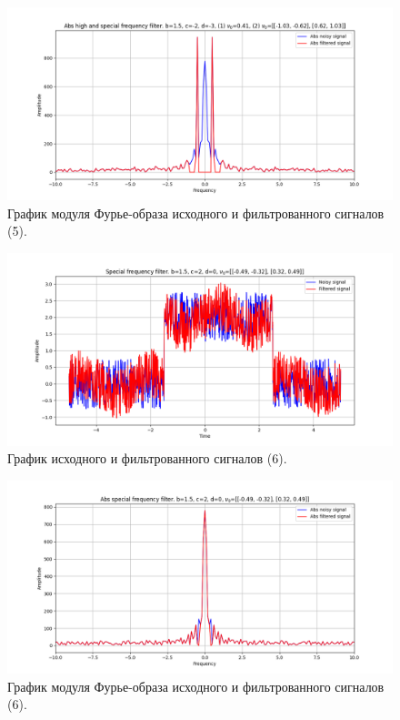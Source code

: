 \documentclass[a4paper, 12pt]{article}
\begin{document}
    \begin{figure}[H]
        \centering
        \includegraphics[scale=0.48]{5_4_abs_u_U_nospec.png}
        \captionsetup{skip=0pt}
        \caption{График модуля Фурье-образа исходного и фильтрованного сигналов (5).}
        \label{fig:fig010}
    \end{figure}
    \begin{figure}[!htb]
        \centering
        \includegraphics[scale=0.48]{6_u_flt_u_nospec.png}
        \captionsetup{skip=0pt}
        \caption{График исходного и фильтрованного сигналов (6).}
        \label{fig:mlll}
    \end{figure}
    \begin{figure}[!htb]
        \centering
        \includegraphics[scale=0.48]{6_abs_u_U_nospec.png}
        \captionsetup{skip=0pt}
        \caption{График модуля Фурье-образа исходного и фильтрованного сигналов (6).}
        \label{fig:dchjdhc}
    \end{figure}
\end{document}
